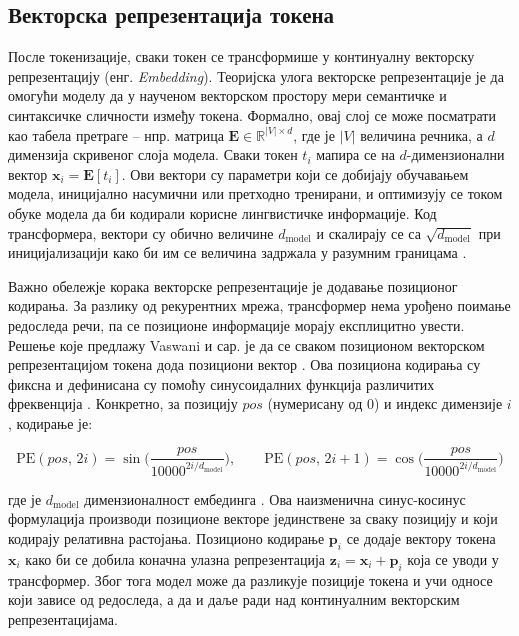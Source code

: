 \subsection{Векторска репрезентација токена}

После токенизације, сваки токен се трансформише у континуалну векторску репрезентацију (енг. \textit{Embedding}). Теоријска улога векторске репрезентације је да омогући моделу да у наученом векторском простору мери семантичке и синтаксичке сличности између токена. Формално, овај слој се може посматрати као табела претраге -- нпр. матрица $\mathbf{E} \in \mathbb{R}^{|V| \times d}$, где је $|V|$ величина речника, а $d$ димензија скривеног слоја модела. Сваки токен $t_i$ мапира се на $d$-димензионални вектор $\mathbf{x}_i = \mathbf{E}[t_i]$. Ови вектори су параметри који се добијају обучавањем модела, иницијално насумични или претходно тренирани, и оптимизују се током обуке модела да би кодирали корисне лингвистичке информације. Код трансформера, вектори су обично величине $d_{\text{model}}$ и скалирају се са $\sqrt{d_{\text{model}}}$ при иницијализацији како би им се величина задржала у разумним границама \cite{vaswani_attention_2017}.

Важно обележје корака векторске репрезентације је додавање позиционог кодирања. За разлику од рекурентних мрежа, трансформер нема урођено поимање редоследа речи, па се позиционе информације морају експлицитно увести. Решење које предлажу Vaswani и сар. је да се сваком позиционом векторском репрезентацијом токена дода позициони вектор \cite{vaswani_attention_2017}. Ова позициона кодирања су фиксна и дефинисана су помоћу синусоидалних функција различитих фреквенција \cite{vaswani_attention_2017}. Конкретно, за позицију $pos$ (нумерисану од 0) и индекс димензије $i$, кодирање је:

\begin{equation}
\text{PE}(pos,\,2i) = \sin\!\Big(\frac{pos}{10000^{2i/d_{\text{model}}}}\Big), \qquad \text{PE}(pos,\,2i+1) = \cos\!\Big(\frac{pos}{10000^{2i/d_{\text{model}}}}\Big)
\label{eq:positional_encoding}
\end{equation}

где је $d_{\text{model}}$ димензионалност ембединга \cite{vaswani_attention_2017}. Ова наизменична синус-косинус формулација производи позиционе векторе јединствене за сваку позицију и који кодирају релативна растојања. Позиционо кодирање $\mathbf{p}_i$ се додаје вектору токена $\mathbf{x}_i$ како би се добила коначна улазна репрезентација $\mathbf{z}_i = \mathbf{x}_i + \mathbf{p}_i$ која се уводи у трансформер. Због тога модел може да разликује позиције токена и учи односе који зависе од редоследа, а да и даље ради над континуалним векторским репрезентацијама.

